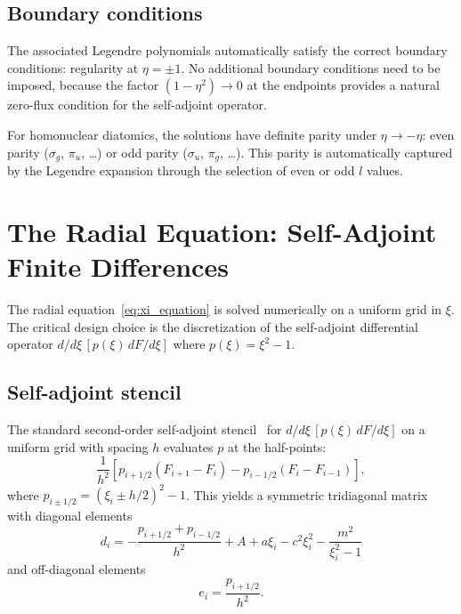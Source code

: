 \documentclass[aps,pra,twocolumn,superscriptaddress,longbibliography]{revtex4-2}
\begin{document}
\subsection{Boundary conditions}

The associated Legendre polynomials automatically satisfy the correct
boundary conditions: regularity at $\eta = \pm 1$.  No additional
boundary conditions need to be imposed, because the factor
$(1 - \eta^2) \to 0$ at the endpoints provides a natural zero-flux
condition for the self-adjoint operator.

For homonuclear diatomics, the solutions have definite parity under
$\eta \to -\eta$: even parity ($\sigma_g$, $\pi_u$, \ldots) or odd
parity ($\sigma_u$, $\pi_g$, \ldots).  This parity is automatically
captured by the Legendre expansion through the selection of even or
odd $l$ values.


\section{The Radial Equation: Self-Adjoint Finite Differences}
\label{sec:radial}

The radial equation~\eqref{eq:xi_equation} is solved numerically
on a uniform grid in $\xi$.  The critical design choice is the
discretization of the self-adjoint differential operator
$d/d\xi\,[p(\xi)\,dF/d\xi]$ where $p(\xi) = \xi^2 - 1$.

\subsection{Self-adjoint stencil}

The standard second-order self-adjoint stencil~\cite{Trefethen2000}
for $d/d\xi\,[p(\xi)\,dF/d\xi]$ on a uniform grid with spacing $h$
evaluates $p$ at the half-points:
\begin{equation}
  \frac{1}{h^2}\left[
    p_{i+1/2}(F_{i+1} - F_i) - p_{i-1/2}(F_i - F_{i-1})
  \right],
  \label{eq:sa_stencil}
\end{equation}
where $p_{i\pm 1/2} = (\xi_i \pm h/2)^2 - 1$.  This yields a
symmetric tridiagonal matrix with diagonal elements
\begin{equation}
  d_i = -\frac{p_{i+1/2} + p_{i-1/2}}{h^2}
        + A + a\xi_i - c^2\xi_i^2 - \frac{m^2}{\xi_i^2 - 1}
  \label{eq:diag}
\end{equation}
and off-diagonal elements
\begin{equation}
  e_i = \frac{p_{i+1/2}}{h^2}.
  \label{eq:offdiag}
\end{equation}
\end{document}
